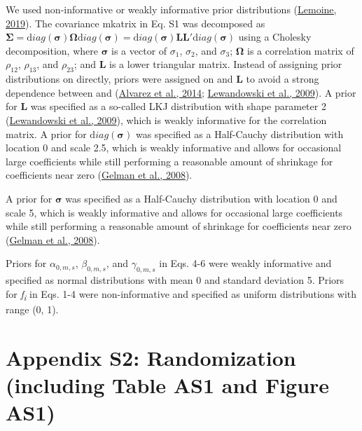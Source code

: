 \documentclass[
  12pt,
  letterpaper,
  DIV=11,
  numbers=noendperiod]{scrartcl}
\begin{document}
We used non-informative or weakly informative prior distributions
(\protect\hyperlink{ref-Lemoine2019}{Lemoine, 2019}). The covariance
mkatrix in Eq. S1 was decomposed as
\({\mathbf \Sigma} = {\mathrm diag}({\mathbf \sigma}){\mathbf \Omega}{\mathrm diag}({\mathbf \sigma}) = {\mathrm diag}({\mathbf \sigma}){\mathbf L}{\mathbf L}\prime {\mathrm diag}({\mathbf \sigma})\)
using a Cholesky decomposition, where \({\mathbf \sigma}\) is a vector
of \(\sigma_{1}\), \(\sigma_{2}\), and \(\sigma_{3}\);
\({\mathbf \Omega}\) is a correlation matrix of \(\rho_{12}\),
\(\rho_{13}\), and \(\rho_{23}\); and \textbf{L} is a lower triangular
matrix. Instead of assigning prior distributions on directly, priors
were assigned on and \textbf{L} to avoid a strong dependence between and
(\protect\hyperlink{ref-Alvarez2014}{Alvarez et al., 2014};
\protect\hyperlink{ref-Lewandowski2009}{Lewandowski et al., 2009}). A
prior for \textbf{L} was specified as a so-called LKJ distribution with
shape parameter 2 (\protect\hyperlink{ref-Lewandowski2009}{Lewandowski
et al., 2009}), which is weakly informative for the correlation matrix.
A prior for \({\mathrm diag}({\mathbf \sigma})\) was specified as a
Half-Cauchy distribution with location 0 and scale 2.5, which is weakly
informative and allows for occasional large coefficients while still
performing a reasonable amount of shrinkage for coefficients near zero
(\protect\hyperlink{ref-Gelman2008}{Gelman et al., 2008}).

A prior for \(\mathbf{\sigma}\) was specified as a Half-Cauchy
distribution with location 0 and scale 5, which is weakly informative
and allows for occasional large coefficients while still performing a
reasonable amount of shrinkage for coefficients near zero
(\protect\hyperlink{ref-Gelman2008}{Gelman et al., 2008}).

Priors for \(\alpha_{0,m,s}\), \(\beta_{0,m,s}\), and \(\gamma_{0,m,s}\)
in Eqs. 4-6 were weakly informative and specified as normal
distributions with mean 0 and standard deviation 5. Priors for
\emph{f\textsubscript{i}} in Eqs. 1-4 were non-informative and specified
as uniform distributions with range (0, 1).

\newpage

\hypertarget{appendix-s2-randomization-including-table-as1-and-figure-as1}{%
\section{Appendix S2: Randomization (including Table AS1 and Figure
AS1)}\label{appendix-s2-randomization-including-table-as1-and-figure-as1}}
\end{document}
